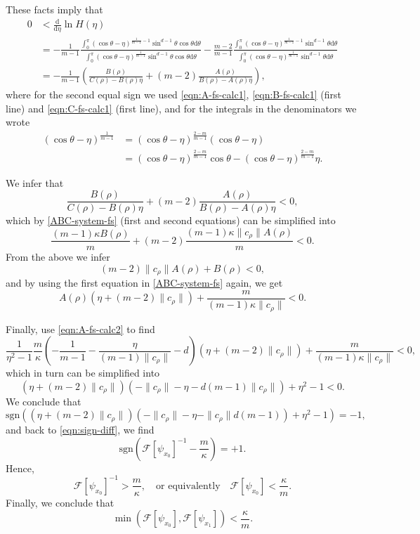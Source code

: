 \documentclass[11pt]{amsart}
\def\d{\mathrm{d}}
\newcommand{\dm}{d} %
\begin{document}
These facts imply that
\begin{align*}
0&<\frac{\d}{\d\eta}\ln H(\eta) \\
& =-\frac{1}{m-1}\frac{\int_0^\pi (\cos\theta-\eta)^{\frac{1}{m-1}-1}\sin^{\dm-1}\theta \cos\theta\d\theta}{\int_0^\pi (\cos\theta-\eta)^{\frac{1}{m-1}}\sin^{\dm-1}\theta \cos\theta\d\theta}-\frac{m-2}{m-1}\frac{\int_0^\pi (\cos\theta-\eta)^{\frac{1}{m-1}-1}\sin^{\dm-1}\theta \d\theta}{\int_0^\pi (\cos\theta-\eta)^{\frac{1}{m-1}}\sin^{\dm-1}\theta \d\theta} \\[2pt]
& = -\frac{1}{m-1} \left( \frac{B(\rho)}{C(\rho)-B(\rho)\eta}+(m-2)\frac{A(\rho)}{B(\rho)-A(\rho)\eta}\right),
\end{align*}
where for the second equal sign we used \eqref{eqn:A-fs-calc1}, \eqref{eqn:B-fs-calc1} (first line) and \eqref{eqn:C-fs-calc1} (first line), and for the integrals in the denominators we wrote 
\begin{align*}
(\cos \theta - \eta)^{\frac{1}{m-1}} &= (\cos \theta - \eta)^{\frac{2-m}{m-1}} (\cos \theta -\eta) \\[2pt]
&= (\cos \theta - \eta)^{\frac{2-m}{m-1}} \cos \theta - (\cos \theta - \eta)^{\frac{2-m}{m-1}} \eta.
\end{align*}

We infer that
\[
\frac{B(\rho)}{C(\rho)-B(\rho)\eta}+(m-2)\frac{A(\rho)}{B(\rho)-A(\rho)\eta}<0,
\]
which by \eqref{ABC-system-fs} (first and second equations) can be simplified into
\[
\frac{(m-1)\kappa B(\rho)}{m}+(m-2)\frac{(m-1)\kappa \|c_\rho\| A(\rho)}{m}<0.
\]
From the above we infer
\[
(m-2)\|c_\rho\| A(\rho)+B(\rho)<0,
\]
and by using the first equation in \eqref{ABC-system-fs} again, we get
\[
A(\rho)(\eta+(m-2)\|c_\rho\|)+\frac{m}{(m-1)\kappa \|c_\rho\|}<0.
\]

Finally, use \eqref{eqn:A-fs-calc2} to find
\[
\frac{1}{\eta^2-1}\frac{m}{\kappa}\left(-\frac{1}{m-1}-\frac{\eta}{(m-1)\|c_\rho\|}-\dm\right)(\eta+(m-2)\|c_\rho\|)+\frac{m}{(m-1)\kappa \|c_\rho\|}<0,
\]
which in turn can be simplified into
\[
(\eta+(m-2)\|c_\rho\|)\left(-\|c_\rho\|-\eta-\dm(m-1)\|c_\rho\|\right)+\eta^2-1<0.
\]
We conclude that
\[
\mathrm{sgn}\left((\eta+(m-2) \|c_\rho\|)(-\|c_\rho\|-\eta-\|c_\rho\|\dm(m-1))+\eta^2-1\right)=-1,
\]
and back to \eqref{eqn:sign-diff}, we find
\[
\mathrm{sgn}\left(\mathcal{F}[\psi_{x_0}]^{-1}-\frac{m}{\kappa}\right)=+1.
\]
Hence, 
\[
\mathcal{F}[\psi_{x_0}]^{-1}>\frac{m}{\kappa},\quad\text{or equivalently}\quad \mathcal{F}[\psi_{x_0}]<\frac{\kappa}{m}.
\]
Finally, we conclude that
\begin{equation}
\label{eqn:minlkm}
\min(\mathcal{F}[\psi_{x_0}],\mathcal{F}[\psi_{x_1}])<\frac{\kappa}{m}.
\end{equation}
\end{document}
